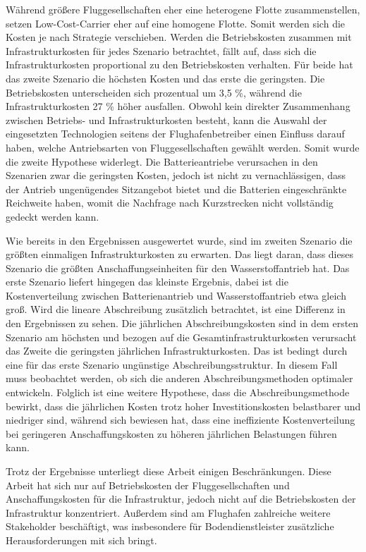 Während größere Fluggesellschaften eher eine heterogene Flotte zusammenstellen, 
setzen Low-Cost-Carrier eher auf eine homogene Flotte.
Somit werden sich die Kosten je nach Strategie verschieben.
Werden die Betriebskosten zusammen mit Infrastrukturkosten für jedes Szenario betrachtet, fällt auf, 
dass sich die Infrastrukturkosten proportional zu den Betriebskosten verhalten. 
Für beide hat das zweite Szenario die höchsten Kosten und das erste die geringsten. 
Die Betriebskosten unterscheiden sich prozentual um 3,5 \%, 
während die Infrastrukturkosten 27 \% höher ausfallen.
Obwohl kein direkter Zusammenhang zwischen Betriebs- und Infrastrukturkosten besteht, 
kann die Auswahl der eingesetzten Technologien seitens der Flughafenbetreiber einen Einfluss darauf haben, 
welche Antriebsarten von Fluggesellschaften gewählt werden. Somit wurde die zweite Hypothese widerlegt.
Die Batterieantriebe verursachen in den Szenarien zwar die geringsten Kosten,
jedoch ist nicht zu vernachlässigen, dass der Antrieb ungenügendes Sitzangebot bietet
und die Batterien eingeschränkte Reichweite haben, 
womit die Nachfrage nach Kurzstrecken nicht vollständig gedeckt werden kann.


Wie bereits in den Ergebnissen ausgewertet wurde, sind im zweiten Szenario die größten einmaligen Infrastrukturkosten zu erwarten.
Das liegt daran, dass dieses Szenario die größten Anschaffungseinheiten für den Wasserstoffantrieb hat. 
Das erste Szenario liefert hingegen das kleinste Ergebnis, dabei ist die Kostenverteilung zwischen Batterienantrieb 
und Wasserstoffantrieb etwa gleich groß.
Wird die lineare Abschreibung zusätzlich betrachtet, ist eine Differenz in den Ergebnissen zu sehen. 
Die jährlichen Abschreibungskosten sind in dem ersten Szenario am höchsten 
und bezogen auf die Gesamtinfrastrukturkosten verursacht das Zweite 
die geringsten jährlichen Infrastrukturkosten.
Das ist bedingt durch eine für das erste Szenario ungünstige Abschreibungsstruktur. 
In diesem Fall muss beobachtet werden, ob sich die anderen Abschreibungsmethoden optimaler entwickeln.
Folglich ist eine weitere Hypothese, dass die Abschreibungsmethode bewirkt, 
dass die jährlichen Kosten trotz hoher Investitionskosten belastbarer und niedriger sind, 
während sich bewiesen hat, dass eine ineffiziente Kostenverteilung bei geringeren Anschaffungskosten zu 
höheren jährlichen Belastungen führen kann.

%
Trotz der Ergebnisse unterliegt diese Arbeit einigen Beschränkungen. %
Diese Arbeit hat sich nur auf Betriebskosten der Fluggesellschaften und Anschaffungskosten für die Infrastruktur,
jedoch nicht auf die Betriebskosten der Infrastruktur konzentriert. 
Außerdem sind am Flughafen zahlreiche weitere Stakeholder beschäftigt, 
was insbesondere für Bodendienstleister zusätzliche Herausforderungen mit sich bringt.

